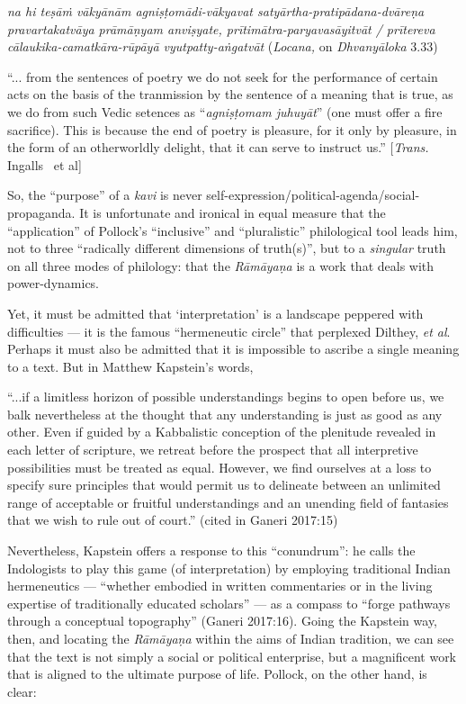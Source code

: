 \begin{myquote}
{{\sl na hi teṣāṁ vākyānām agniṣṭomādi-vākyavat satyārtha-pratipādana-dvāreṇa pravartakatvāya prāmāṇyam anviṣyate, prītimātra-paryavasāyitvāt / prītereva cālaukika-camatkāra-rūpāyā vyutpatty-aṅgatvāt}} ({\sl Locana,} on {\sl Dhvanyāloka} 3.33)

 “... from the sentences of poetry we do not seek for the performance of certain acts on the basis of the tranmission by the sentence of a meaning that is true, as we do from such Vedic setences as “{\sl agniṣṭomam juhuyāt}” (one must offer a fire sacrifice). This is because the end of poetry is pleasure, for it only by pleasure, in the form of an otherworldly delight, that it can serve to instruct us.”
\hfill  [{\sl Trans.} Ingalls~ et al]
\end{myquote}

So, the “purpose” of a {\sl kavi} is never self-expression/political-agenda/\-social-propaganda. It is unfortunate and ironical in equal measure that the “application” of Pollock’s “inclusive” and “pluralistic” philological tool leads him, not to three “radically different dimensions of truth(s)”, but to a {\sl singular} truth on all three modes of philology: that the {\sl Rāmāyaṇa} is a work that deals with power-dynamics. 

Yet, it must be admitted that ‘interpretation’ is a landscape peppered with difficulties — it is the famous “hermeneutic circle” that perplexed Dilthey, {\sl et al}. Perhaps it must also be admitted that it is impossible to ascribe a single meaning to a text. But in Matthew Kapstein’s words, 

\begin{myquote}
“...if a limitless horizon of possible understandings begins to open before us, we balk nevertheless at the thought that any understanding is just as good as any other. Even if guided by a Kabbalistic conception of the plenitude revealed in each letter of scripture, we retreat before the prospect that all interpretive possibilities must be treated as equal. However, we find ourselves at a loss to specify sure principles that would permit us to delineate between an unlimited range of acceptable or fruitful understandings and an unending field of fantasies that we wish to rule out of court.”
\hfill (cited in Ganeri 2017:15) 
\end{myquote}

Nevertheless, Kapstein offers a response to this “conundrum”: he calls the Indologists to play this game (of interpretation) by employing traditional Indian hermeneutics — “whether embodied in written commentaries or in the living expertise of traditionally educated scholars” — as a compass to “forge pathways through a conceptual topography” (Ganeri 2017:16). Going the Kapstein way, then, and locating the {\sl Rāmāyaṇa} within the aims of Indian tradition, we can see that the text is not simply a social or political enterprise, but a magnificent work that is aligned to the ultimate purpose of life. Pollock, on the other hand, is clear:

